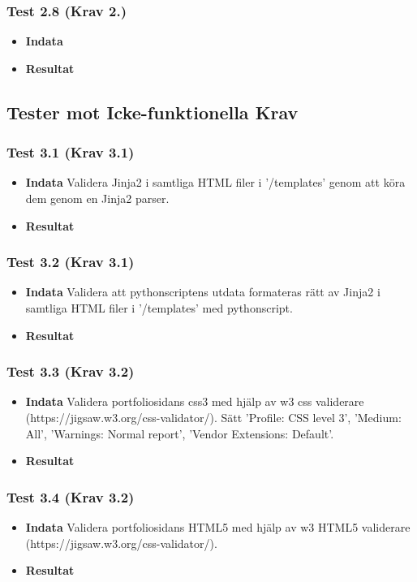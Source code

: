 \documentclass{TDP003mall}
\begin{document}
\subsubsection*{Test 2.8 (Krav 2.)}
\begin{itemize}
\item[]\textbf{Indata}
\item[]\textbf{Resultat} 
\end{itemize}






\subsection{Tester mot Icke-funktionella Krav}
\subsubsection*{Test 3.1 (Krav 3.1)}
\begin{itemize}
\item[]\textbf{Indata} Validera Jinja2 i samtliga HTML filer i '/templates' genom att köra dem genom en Jinja2 parser.
\item[]\textbf{Resultat} 
\end{itemize}
\subsubsection*{Test 3.2 (Krav 3.1)}
\begin{itemize}
\item[]\textbf{Indata} Validera att pythonscriptens utdata formateras rätt av Jinja2 i samtliga HTML filer i '/templates' med pythonscript.
\item[]\textbf{Resultat} 
\end{itemize}
\subsubsection*{Test 3.3 (Krav 3.2)}
\begin{itemize}%
\item[]\textbf{Indata} Validera portfoliosidans css3 med hjälp av w3 css validerare (https://jigsaw.w3.org/css-validator/). Sätt 'Profile: CSS level 3', 'Medium: All', 'Warnings: Normal report', 'Vendor Extensions: Default'.
\item[]\textbf{Resultat} 
\end{itemize}
\subsubsection*{Test 3.4 (Krav 3.2)}
\begin{itemize}%
\item[]\textbf{Indata} Validera portfoliosidans HTML5 med hjälp av w3 HTML5 validerare (https://jigsaw.w3.org/css-validator/). 
\item[]\textbf{Resultat} 
\end{itemize}
\end{document}
